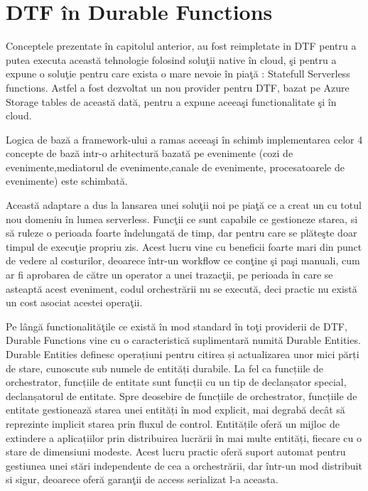 \section{DTF în Durable Functions} 
\quad Conceptele prezentate în capitolul anterior, au fost reimpletate in DTF pentru a putea executa această tehnologie folosind soluţii native în cloud, şi pentru a expune o soluţie pentru care exista o mare nevoie în piaţă : Statefull Serverless functions. Astfel a fost dezvoltat un nou provider pentru DTF, bazat pe Azure Storage tables de această dată, pentru a expune aceeaşi functionalitate şi în cloud. 
\par Logica de bază a framework-ului a ramas aceeaşi în schimb implementarea celor 4 concepte de bază intr-o arhitectură bazată pe evenimente (cozi de evenimente,mediatorul de evenimente,canale de evenimente, procesatoarele de evenimente) este schimbată.
\par Această adaptare a dus la lansarea unei soluţii noi pe piaţă ce a creat un cu totul nou domeniu în lumea serverless. Funcţii ce sunt capabile ce gestioneze starea, si să ruleze o perioada foarte îndelungată de timp, dar pentru care se plăteşte doar timpul de execuţie propriu zis. Acest lucru vine cu beneficii foarte mari din punct de vedere al costurilor, deoarece într-un workflow ce conţine şi paşi manuali, cum ar fi aprobarea de către un operator a unei trazacţii, pe perioada în care se asteaptă acest eveniment, codul orchestrării nu se execută, deci practic nu există un cost asociat acestei operaţii. 
\par Pe lângă functionalităţile ce există în mod standard în toţi providerii de DTF, Durable Functions vine cu o caracteristică suplimentară numită Durable Entities. Durable Entities definesc operațiuni pentru citirea și actualizarea unor mici părți de stare, cunoscute sub numele de entități durabile. La fel ca funcțiile de orchestrator, funcțiile de entitate sunt funcții cu un tip de declanșator special, declanșatorul de entitate. Spre deosebire de funcțiile de orchestrator, funcțiile de entitate gestionează starea unei entități în mod explicit, mai degrabă decât să reprezinte implicit starea prin fluxul de control. Entitățile oferă un mijloc de extindere a aplicațiilor prin distribuirea lucrării în mai multe entități, fiecare cu o stare de dimensiuni modeste. Acest lucru practic oferă suport automat pentru gestiunea unei stări independente de cea a orchestrării, dar într-un mod distribuit si sigur, deoarece oferă garanţii de access serializat l-a aceasta. 
